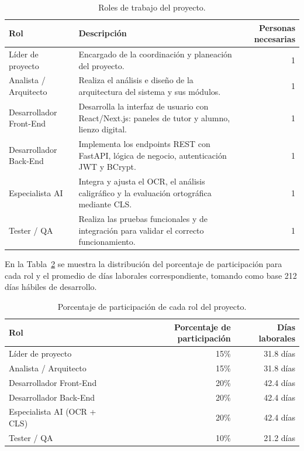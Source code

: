 \begin{table}[H]
\centering
\caption{Roles de trabajo del proyecto.}
\label{tab:roles}
\renewcommand{\arraystretch}{1.3}
\begin{tabularx}{\textwidth}{|l|X|r|}
\hline
\textbf{Rol} & \textbf{Descripción} & \textbf{Personas necesarias} \\
\hline
Líder de proyecto       & Encargado de la coordinación y planeación del proyecto.                                          & 1 \\
\hline
Analista / Arquitecto   & Realiza el análisis e diseño de la arquitectura del sistema y sus módulos.                       & 1 \\
\hline
Desarrollador Front-End & Desarrolla la interfaz de usuario con React/Next.js: paneles de tutor y alumno, lienzo digital.  & 1 \\
\hline
Desarrollador Back-End  & Implementa los endpoints REST con FastAPI, lógica de negocio, autenticación JWT y BCrypt.        & 1 \\
\hline
Especialista AI         & Integra y ajusta el OCR, el análisis caligráfico y la evaluación ortográfica mediante CLS.    & 1 \\
\hline
Tester / QA             & Realiza las pruebas funcionales y de integración para validar el correcto funcionamiento.        & 1 \\
\hline
\end{tabularx}
\end{table}
 
En la Tabla~\ref{tab:participacion} se muestra la distribución del porcentaje de participación para cada rol y el promedio de días laborales correspondiente, tomando como base 212 días hábiles de desarrollo.
 
\begin{table}[H]
\centering
\caption{Porcentaje de participación de cada rol del proyecto.}
\label{tab:participacion}
\renewcommand{\arraystretch}{1.3}
\begin{tabularx}{\textwidth}{|X|r|r|}
\hline
\textbf{Rol} & \textbf{Porcentaje de participación} & \textbf{Días laborales} \\
\hline
Líder de proyecto       & 15\% & 31.8 días \\
\hline
Analista / Arquitecto   & 15\% & 31.8 días \\
\hline
Desarrollador Front-End & 20\% & 42.4 días \\
\hline
Desarrollador Back-End  & 20\% & 42.4 días \\
\hline
Especialista AI (OCR + CLS) & 20\% & 42.4 días \\
\hline
Tester / QA             & 10\% & 21.2 días \\
\hline
\end{tabularx}
\end{table}
 
